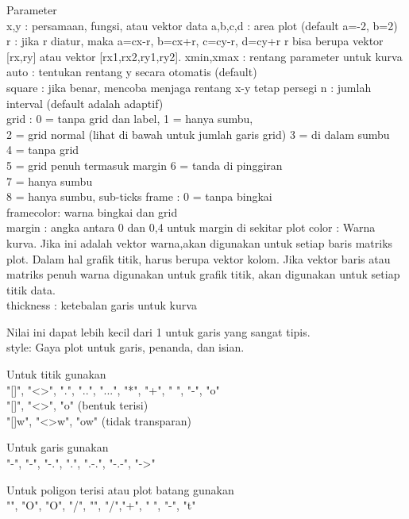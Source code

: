 \documentclass[a4paper,10pt]{article}
\begin{document}
\begin{eulernotebook}
\begin{eulercomment}
\begin{eulercomment}
\begin{eulercomment}
Parameter\\
x,y : persamaan, fungsi, atau vektor data a,b,c,d : area plot (default
a=-2, b=2)\\
r  :  jika  r  diatur,  maka  a=cx-r,  b=cx+r,  c=cy-r,  d=cy+r r bisa
berupa vektor [rx,ry] atau vektor [rx1,rx2,ry1,ry2]. xmin,xmax :
rentang parameter untuk kurva\\
auto : tentukan rentang y secara otomatis (default)\\
square : jika benar, mencoba menjaga rentang x-y tetap persegi n :
jumlah interval (default adalah adaptif)\\
grid : 0 = tanpa grid dan label, 1 = hanya sumbu,\\
2 = grid normal (lihat di bawah untuk jumlah garis grid) 3 = di dalam
sumbu\\
4 = tanpa grid\\
5 = grid penuh termasuk margin 6 = tanda di pinggiran\\
7 = hanya sumbu\\
8 = hanya sumbu, sub-ticks frame : 0 = tanpa bingkai\\
framecolor: warna bingkai dan grid\\
margin : angka antara 0 dan 0,4 untuk margin di sekitar plot color :
Warna kurva. Jika ini adalah vektor warna,akan digunakan untuk setiap
baris matriks plot. Dalam  hal grafik titik, harus berupa vektor
kolom. Jika vektor baris atau matriks penuh warna digunakan untuk
grafik titik, akan digunakan untuk setiap titik data.\\
thickness : ketebalan garis untuk kurva

Nilai ini dapat lebih kecil dari 1 untuk garis yang sangat tipis. \\
style: Gaya plot untuk garis, penanda, dan isian.

Untuk titik gunakan\\
"[]", "\textless{}\textgreater{}", ".", "..", "...", "*", "+", " ", "-", "o"\\
"[]", "\textless{}\textgreater{}", "o" (bentuk terisi)\\
"[]w", "\textless{}\textgreater{}w", "ow" (tidak transparan)

Untuk garis gunakan\\
"-", "-", "-.", ".", ".-.", "-.-", "-\textgreater{}"

Untuk poligon terisi atau plot batang gunakan\\
"", "O", "O", "/", "", "/","+", " ", "-", "t"


\end{eulercomment}
\end{eulercomment}
\end{eulercomment}
\end{eulernotebook}
\end{document}
